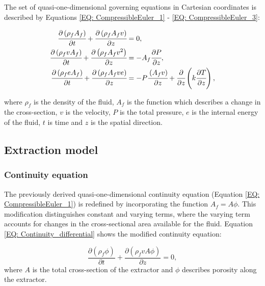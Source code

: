 \documentclass[a4paper,fleqn]{cas-dc}
\begin{document}
	The set of quasi-one-dimensional governing equations in Cartesian coordinates is described by Equations \ref{EQ: CompressibleEuler_1} - \ref{EQ: CompressibleEuler_3}:
	
	{\footnotesize
		\begin{align}
			\label{EQ: CompressibleEuler_1}
			\cfrac{\partial \left( \rho_f A_f \right) }{\partial t} + \cfrac{\partial \left( \rho_f A_f v \right)}{\partial z} &= 0, \\
			\cfrac{\partial \left( \rho_f v A_f \right) }{\partial t} + \cfrac{\partial \left( \rho_f A_f v^2 \right)}{\partial z} &= -A_f \cfrac{\partial P}{\partial z} \label{EQ: CompressibleEuler_2}, \\
			\cfrac{\partial \left( \rho_f e A_f \right) }{\partial t} + \cfrac{\partial \left( \rho_f A_f v e\right)}{\partial z} &= -P\cfrac{\left( A_f v \right)}{\partial z} + \cfrac{\partial}{\partial z} \left( k \cfrac{\partial T}{\partial z} \right),   
			\label{EQ: CompressibleEuler_3}
		\end{align}  
	}
	
	where $\rho_f$ is the density of the fluid, $A_f$ is the function which describes a change in the cross-section, $v$ is the velocity, $P$ is the total pressure, $e$ is the internal energy of the fluid, $t$ is time and $z$ is the spatial direction.
	
	\subsection{Extraction model} \label{CH: Extraction_model}
	\subsubsection{Continuity equation} \label{CH: Continuity}
	
	The previously derived quasi-one-dimensional continuity equation (Equation \ref{EQ: CompressibleEuler_1}) is redefined by incorporating the function $A_f = A\phi$. This modification distinguishes constant and varying terms, where the varying term accounts for changes in the cross-sectional area available for the fluid. Equation \ref{EQ: Continuity_differential} shows the modified continuity equation:
	
	{\footnotesize
		\begin{equation} \label{EQ: Continuity_differential}
			\frac{\partial (\rho_f \phi)}{\partial t} + \frac{\partial (\rho_f v A\phi)}{\partial z} = 0,
		\end{equation}
	}
	where $A$ is the total cross-section of the extractor and $\phi$ describes porosity along the extractor.
	
\end{document}
